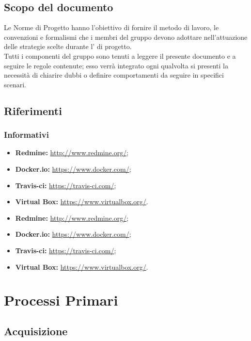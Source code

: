 \documentclass{scalatekids-article}
\begin{document}
\subsection{Scopo del documento}

Le Norme di Progetto hanno l'obiettivo di fornire il metodo di lavoro, le
convenzioni e formalismi che i membri del gruppo devono adottare nell'attuazione
delle strategie scelte durante l' di progetto. \\
Tutti i componenti del gruppo sono tenuti a leggere il presente documento e a seguire
le regole contenute; esso verrà integrato ogni qualvolta si presenti la necessità di
chiarire dubbi o definire comportamenti da seguire in specifici scenari.

\prodPurpose \glossExpl

\subsection{Riferimenti}

\subsubsection{Informativi}

\begin{itemize}
    \item\textbf{Redmine:} \url{http://www.redmine.org/};
    \item\textbf{Docker.io:} \url{https://www.docker.com/};
    \item\textbf{Travis-ci:} \url{https://travis-ci.com/};
    \item\textbf{Virtual Box:} \url{https://www.virtualbox.org/}.
\end{itemize}
\begin{itemize}
    \item \textbf{Redmine:} \url{http://www.redmine.org/};
    \item \textbf{Docker.io:} \url{https://www.docker.com/};
    \item \textbf{Travis-ci:} \url{https://travis-ci.com/};
    \item \textbf{Virtual Box:} \url{https://www.virtualbox.org/}.
\end{itemize}

\section{Processi Primari}

\subsection{Acquisizione}
\end{document}
